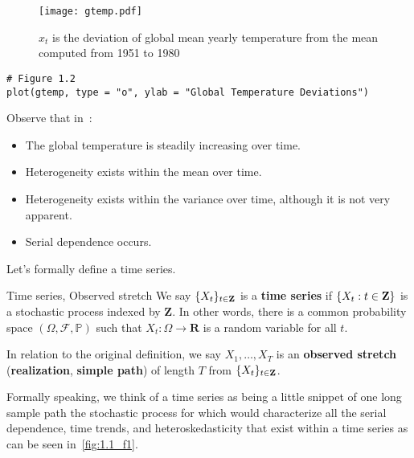 \begin{figure}[!htbp]
    \centering
    \texttt{[image: gtemp.pdf]}
    \caption{$ x_t $ is the deviation of global mean
        yearly temperature from the mean computed from 1951 to 1980}\label{fig:gtemp}
\end{figure}
\begin{verbatim}
# Figure 1.2
plot(gtemp, type = "o", ylab = "Global Temperature Deviations")
\end{verbatim}
Observe that in~:
\begin{itemize}
    \item The global temperature is steadily increasing over time.
    \item Heterogeneity exists within the mean over time.
    \item Heterogeneity exists within the variance over time, although it is not very apparent.
    \item Serial dependence occurs.
\end{itemize}
Let's formally define a time series.
\begin{Definition}{Time series, Observed stretch}{}
    We say $ \{X_t\}_{t\in\mathbf{Z}} $
    is a \textbf{time series} if $ \{X_t : t\in\mathbf{Z}\} $
    is a stochastic process indexed by $ \mathbf{Z} $.
    In other words, there is a common probability space
    $ (\Omega,\mathcal{F},\mathbb{P}) $ such that
    $ X_t:\Omega\to\mathbf{R} $ is a random variable
    for all $ t $.

    In relation to the original definition, we say
    $ X_1,\ldots,X_T $ is an \textbf{observed stretch} (\textbf{realization},
    \textbf{simple path}) of length $ T $ from $ \{X_t\}_{t\in\mathbf{Z}} $.
\end{Definition}
{\color{blue}Formally speaking, we think of a time series as being a little snippet
of one long sample path the stochastic process for which would characterize
all the serial dependence, time trends, and heteroskedasticity
that exist within a time series as can be seen in~\ref{fig:1.1_f1}.}
